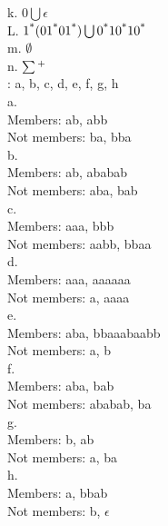 \documentclass[12pt]{article}
\begin{document}
k. $ 0 \bigcup \epsilon $ \\

L. $ 1 \textsuperscript{*} (01\textsuperscript{*}01\textsuperscript{*}) \bigcup 0 
     \textsuperscript{*} 10 \textsuperscript{*} 10 \textsuperscript{*} $ \\

m. $ \emptyset $ \\

n. $ \sum \textsuperscript{+} $ \\


: a, b, c, d, e, f, g, h \\

\noindent
a. \\
Members: ab, abb \\
Not members: ba, bba \\

\noindent
b. \\
Members: ab, ababab \\
Not members: aba, bab \\

\noindent
c. \\
Members: aaa, bbb \\
Not members: aabb, bbaa \\

\noindent
d. \\
Members: aaa, aaaaaa  \\
Not members: a, aaaa
 \\

\noindent
e. \\
Members: aba, bbaaabaabb \\
Not members: a, b
 \\

\noindent
f. \\
Members: aba, bab \\
Not members: ababab, ba \\

\noindent
g. \\
Members: b, ab \\
Not members: a, ba \\

\noindent
h. \\
Members: a, bbab \\
Not members: b, $\epsilon$
\\


 \\


 \\
\end{document}
